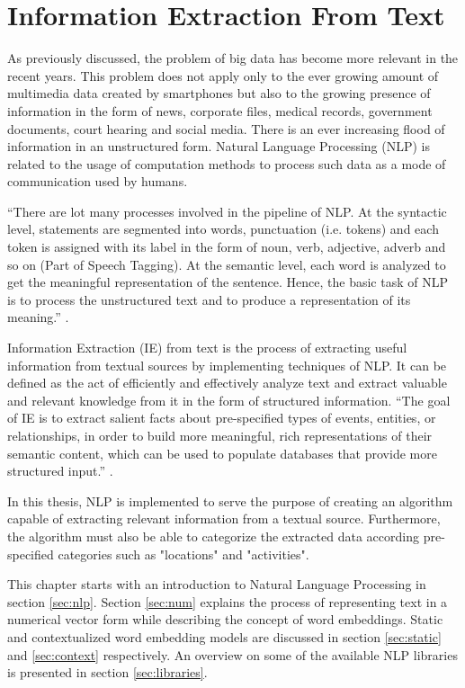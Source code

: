 \cleardoublepage


\chapter{Information Extraction From Text}
\label{ch:nlp}

As previously discussed, the problem of big data has become more relevant in the recent years.  This problem does not apply only to the ever growing amount of multimedia data created by smartphones but also to the growing presence of information in the form of news, corporate files, medical records, government documents, court hearing and social media. There is an ever increasing flood of information in an unstructured form. Natural Language Processing (NLP) is related to the usage of computation methods to process such data as a mode of communication used by humans.

``There are lot many processes involved in the pipeline of NLP. At the syntactic level, statements are segmented into words, punctuation (i.e.  tokens) and each token is assigned with its label in the form of noun, verb, adjective, adverb and so on (Part of Speech Tagging).  At the semantic level, each word is analyzed to get the meaningful representation of the sentence.  Hence, the basic task of NLP is to process the unstructured text and to produce a representation of its meaning.''  \cite{singh2018natural}.



Information Extraction (IE) from text is the process of extracting useful information from textual sources by implementing techniques of NLP. It can be defined as the act of efficiently and effectively analyze text and extract valuable and relevant knowledge from it in the form of structured information. ``The goal of IE is to extract salient facts about pre-specified types of events, entities, or relationships, in order to build more meaningful, rich representations of their semantic content, which can be used to populate databases that provide more structured input.'' \cite{singh2018natural}.

In this thesis, NLP is implemented to serve the purpose of creating an algorithm capable of extracting relevant information from a textual source. Furthermore, the algorithm must also be able to categorize the extracted data according pre-specified categories such as "locations" and "activities".

This chapter starts with an introduction to Natural Language Processing in section \ref{sec:nlp}. Section \ref{sec:num} explains the process of representing text in a numerical vector form while describing the concept of word embeddings. Static and contextualized word embedding models are discussed in section \ref{sec:static} and \ref{sec:context} respectively. An overview on some of the available NLP libraries is presented in section \ref{sec:libraries}.

